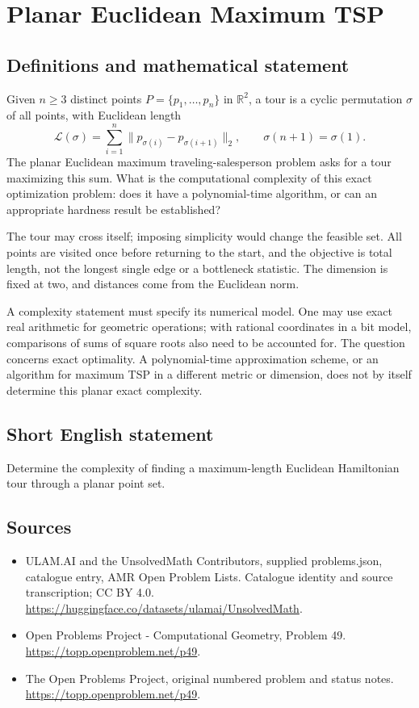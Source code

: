 \documentclass[11pt,a4paper]{article}
\begin{document}
\section*{Planar Euclidean Maximum TSP}\label{statement}

\subsection{Definitions and mathematical statement}
Given $n\ge3$ distinct points $P=\{p_1,\ldots,p_n\}$ in
$\mathbb R^2$, a tour is a cyclic permutation $\sigma$ of all
points, with Euclidean length
\[
  \mathcal L(\sigma)=\sum_{i=1}^{n}
          \|p_{\sigma(i)}-p_{\sigma(i+1)}\|_2,
                    \qquad\sigma(n+1)=\sigma(1).
\]
The planar Euclidean maximum traveling-salesperson problem
asks for a tour maximizing this sum. What is the computational
complexity of this exact optimization problem: does it have
a polynomial-time algorithm, or can an appropriate hardness
result be established?

The tour may cross itself; imposing simplicity would change
the feasible set. All points are visited once before returning
to the start, and the objective is total length, not the longest
single edge or a bottleneck statistic. The dimension is fixed
at two, and distances come from the Euclidean norm.

A complexity statement must specify its numerical model.
One may use exact real arithmetic for geometric operations;
with rational coordinates in a bit model, comparisons of sums
of square roots also need to be accounted for. The question
concerns exact optimality. A polynomial-time approximation
scheme, or an algorithm for maximum TSP in a different metric
or dimension, does not by itself determine this planar exact
complexity.
\subsection{Short English statement}
Determine the complexity of finding a maximum-length Euclidean Hamiltonian tour through a planar point set.
\subsection{Sources}
\begin{itemize}
\item[S1] ULAM.AI and the UnsolvedMath Contributors, supplied problems.json, catalogue entry, AMR Open Problem Lists. Catalogue identity and source transcription; CC BY 4.0.
\url{https://huggingface.co/datasets/ulamai/UnsolvedMath}.
\item[S2] Open Problems Project - Computational Geometry, Problem 49. 
\url{https://topp.openproblem.net/p49}.
\item[S3] The Open Problems Project, original numbered problem and status notes.
\url{https://topp.openproblem.net/p49}.
\end{itemize}
\end{document}

